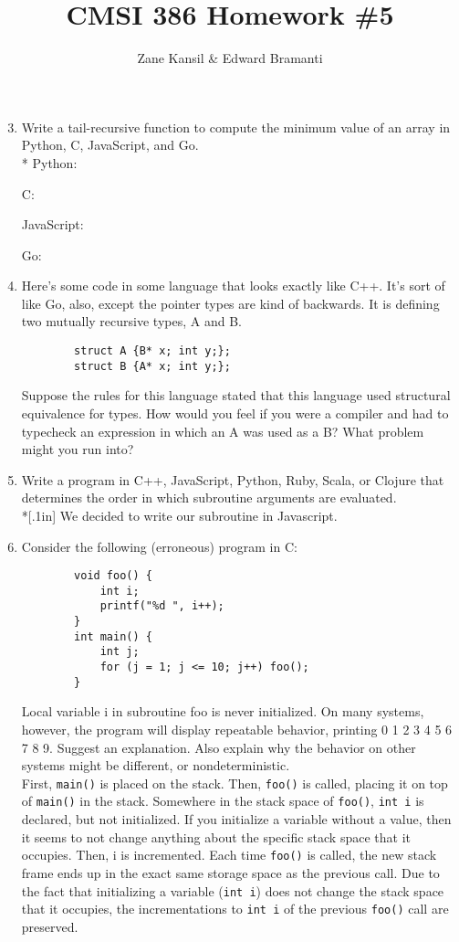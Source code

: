\documentclass{article}
\title{CMSI 386 Homework \#5}
\author{Zane Kansil \& Edward Bramanti}
\begin{document}
\maketitle
\begin{enumerate}
    \setcounter{enumi}{2}
    \item Write a tail-recursive function to compute the minimum value of an array in Python, C, JavaScript, and Go. \\*
    \linebreak
    Python:
    
    \pagebreak
    C:
    
    \pagebreak
    JavaScript:
    
    \pagebreak
    Go:
    
    \pagebreak
    \item Here's some code in some language that looks exactly like C++. It's sort of like Go, also, except the pointer types are kind of backwards. It is defining two mutually recursive types, A and B.
    \begin{verbatim}
        struct A {B* x; int y;};
        struct B {A* x; int y;};
    \end{verbatim}
    Suppose the rules for this language stated that this language used structural equivalence for types. How would you feel if you were a compiler and had to typecheck an expression in which an A was used as a B? What problem might you run into?
    \pagebreak
    \item Write a program in C++, JavaScript, Python, Ruby, Scala, or Clojure that determines the order in which subroutine arguments are evaluated.\\*[.1in]
    We decided to write our subroutine in Javascript.
    
    \pagebreak
    \item Consider the following (erroneous) program in C:
    \begin{verbatim}
        void foo() {
            int i;
            printf("%d ", i++);
        }
        int main() {
            int j;
            for (j = 1; j <= 10; j++) foo();
        }
    \end{verbatim}
    Local variable i in subroutine foo is never initialized. On many systems, however, the program will display repeatable behavior, printing 0 1 2 3 4 5 6 7 8 9. Suggest an explanation. Also explain why the behavior on other systems might be different, or nondeterministic. \\

    First, \texttt{main()} is placed on the stack. Then, \texttt{foo()} is called, placing it on top of \texttt{main()} in the stack. Somewhere in the stack space of \texttt{foo()}, \texttt{int i} is declared, but not initialized. If you initialize a variable without a value, then it seems to not change anything about the specific stack space that it occupies. Then, i is incremented. Each time \texttt{foo()} is called, the new stack frame ends up in the exact same storage space as the previous call. Due to the fact that initializing a variable (\texttt{int i}) does not change the stack space that it occupies, the incrementations to \texttt{int i} of the previous \texttt{foo()} call are preserved. \\


\end{enumerate}
\end{document}
